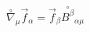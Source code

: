 \begin{equation}
\label{e6:2}
\stackrel{\circ}{\nabla}_{\mu}\vec{f}_{\alpha}=\vec{f}_{\beta} \stackrel{\circ}{B^{\beta}}_{\alpha\mu}
\end{equation}

